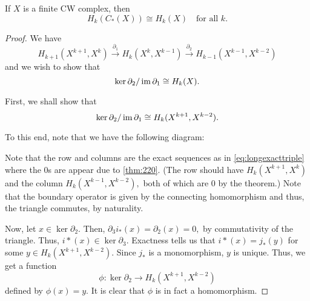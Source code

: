 \documentclass[12pt]{article}
\begin{document}
\begin{thm}
	If $X$ is a finite CW complex, then
	\begin{equation*} 
		H_k(C_*(X)) \cong H_k(X) \quad \text{for all }k.
	\end{equation*}
\end{thm}
\begin{proof} 
	We have 
	\begin{equation*} 
		H_{k+1}(X^{k+1}, X^k) \overset{\partial_1}{\longrightarrow} H_k(X^k, X^{k-1}) \overset{\partial_2}{\longrightarrow} H_{k-1}(X^{k-1}, X^{k-2})
	\end{equation*}
	and we wish to show that
	\begin{equation} \label{eq:goal}
		\ker \partial_2/\operatorname{im} \partial_1 \cong H_k(X).
	\end{equation}

	First, we shall show that
	\begin{equation*} 
		\ker \partial_2/\operatorname{im} \partial_1 \cong H_k(X^{k+1}, X^{k-2}).
	\end{equation*}

	To this end, note that we have the following diagram:
	\begin{center}
	\end{center}

	Note that the row and columns are the exact sequences as in \cref{eq:longexacttriple} where the $0$s are appear due to \cref{thm:220}. (The row should have $H_k(X^{k+1}, X^k)$ and the column $H_k(X^{k-1}, X^{k-2}),$ both of which are $0$ by the theorem.) Note that the boundary operator is given by the connecting homomorphism and thus, the triangle commutes, by naturality.

	Now, let $x \in \ker \partial_2.$ Then, $\partial_3i_*(x) = \partial_2(x) = 0,$ by commutativity of the triangle. Thus, $i*(x) \in \ker\partial_3.$ Exactness tells us that $i*(x) = j_*(y)$ for some $y \in H_k(X^{k+1}, X^{k-2}).$ Since $j_*$ is a monomorphism, $y$ is unique. Thus, we get a function
	\begin{equation*} 
		\phi:\ker\partial_2 \to H_k(X^{k+1}, X^{k-2})
	\end{equation*}
	defined by $\phi(x) = y.$ It is clear that $\phi$ is in fact a homomorphism.


\end{proof}
\end{document}
